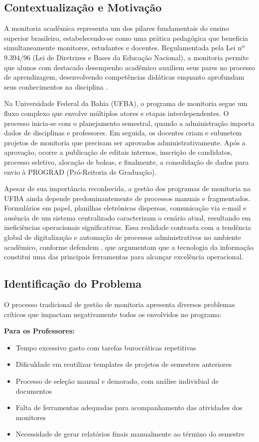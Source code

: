 \documentclass[portuguese]{sbc2025}%
\begin{document}
\subsection{Contextualização e Motivação}

A monitoria acadêmica representa um dos pilares fundamentais do ensino superior brasileiro, estabelecendo-se como uma prática pedagógica que beneficia simultaneamente monitores, estudantes e docentes. Regulamentada pela Lei nº 9.394/96 (Lei de Diretrizes e Bases da Educação Nacional), a monitoria permite que alunos com destacado desempenho acadêmico auxiliem seus pares no processo de aprendizagem, desenvolvendo competências didáticas enquanto aprofundam seus conhecimentos na disciplina \cite{Brasil1996}.

Na Universidade Federal da Bahia (UFBA), o programa de monitoria segue um fluxo complexo que envolve múltiplos atores e etapas interdependentes. O processo inicia-se com o planejamento semestral, quando a administração importa dados de disciplinas e professores. Em seguida, os docentes criam e submetem projetos de monitoria que precisam ser aprovados administrativamente. Após a aprovação, ocorre a publicação de editais internos, inscrição de candidatos, processo seletivo, alocação de bolsas, e finalmente, a consolidação de dados para envio à PROGRAD (Pró-Reitoria de Graduação).

Apesar de sua importância reconhecida, a gestão dos programas de monitoria na UFBA ainda depende predominantemente de processos manuais e fragmentados. Formulários em papel, planilhas eletrônicas dispersas, comunicação via e-mail e ausência de um sistema centralizado caracterizam o cenário atual, resultando em ineficiências operacionais significativas. Essa realidade contrasta com a tendência global de digitalização e automação de processos administrativos no ambiente acadêmico, conforme defendem \cite{Laudon_Laudon_2011}, que argumentam que a tecnologia da informação constitui uma das principais ferramentas para alcançar excelência operacional.

\subsection{Identificação do Problema}

O processo tradicional de gestão de monitoria apresenta diversos problemas críticos que impactam negativamente todos os envolvidos no programa:

\textbf{Para os Professores:}
\begin{itemize}
  \item Tempo excessivo gasto com tarefas burocráticas repetitivas
  \item Dificuldade em reutilizar templates de projetos de semestres anteriores
  \item Processo de seleção manual e demorado, com análise individual de documentos
  \item Falta de ferramentas adequadas para acompanhamento das atividades dos monitores
  \item Necessidade de gerar relatórios finais manualmente ao término do semestre
\end{itemize}
\end{document}
